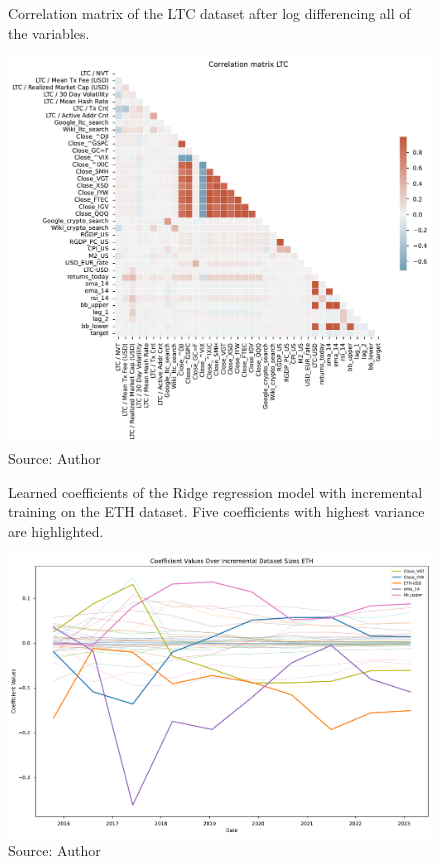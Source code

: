 \begin{figure}[!h]
    \centering
    \caption{Correlation matrix of the LTC dataset after
    log differencing all of the variables.}
    \includegraphics[width=1\textwidth]{Figures/Corr_ltc_logdiff.pdf}
    \caption*{Source: Author}
    \label{fig:Corr_ltc_logdiff}
\end{figure}


\begin{figure}[!h]
    \centering
    \caption{Learned coefficients of the Ridge regression model
    with incremental training on the ETH dataset. Five 
    coefficients with highest variance are highlighted.}
    \includegraphics[width=1\textwidth]{Figures/coefficient_values_incremental_eth.pdf}
    \caption*{Source: Author}
    \label{fig:coefs_incremental_eth}
\end{figure}

